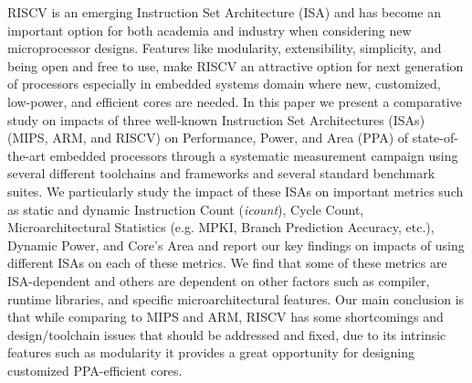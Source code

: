 RISCV is an emerging Instruction Set Architecture (ISA) and has become an important option for both academia and industry when considering new microprocessor designs. Features like modularity, extensibility, simplicity, and being open and free to use, make RISCV an attractive option for next generation of processors especially in embedded systems domain where new, customized, low-power, and efficient cores are needed.  In this paper we present a comparative study on impacts of three well-known Instruction Set Architectures (ISAs) (MIPS, ARM, and RISCV) on Performance, Power, and Area (PPA) of state-of-the-art embedded processors through a systematic measurement campaign using several different toolchains and frameworks and several standard benchmark suites.  We particularly study the impact of these ISAs on important metrics such as static and dynamic Instruction Count (\textit{icount}), Cycle Count, Microarchitectural Statistics (e.g. MPKI, Branch Prediction Accuracy, etc.), Dynamic Power, and Core's Area and report our key findings on impacts of using different ISAs on each of these metrics. We find that some of these metrics are ISA-dependent and others are dependent on other factors such as compiler, runtime libraries, and specific microarchitectural features. Our main conclusion is that while comparing to MIPS and ARM, RISCV has some shortcomings and design/toolchain issues that should be addressed and fixed, due to its intrinsic features such as modularity it provides a great opportunity for designing customized PPA-efficient cores.   


